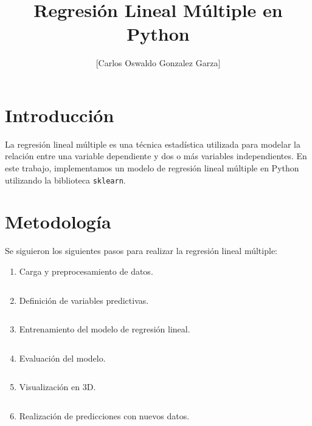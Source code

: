 \documentclass{article}
\title{Regresi\'on Lineal M\'ultiple en Python}
\author{[Carlos Oswaldo Gonzalez Garza]}
\begin{document}
\maketitle

\section{Introducci\'on}
La regresi\'on lineal m\'ultiple es una t\'ecnica estad\'istica utilizada para modelar la relaci\'on entre una variable dependiente y dos o m\'as variables independientes. En este trabajo, implementamos un modelo de regresi\'on lineal m\'ultiple en Python utilizando la biblioteca \texttt{sklearn}.

\section{Metodolog\'ia}
Se siguieron los siguientes pasos para realizar la regresi\'on lineal m\'ultiple:
\begin{enumerate}
    \item Carga y preprocesamiento de datos.
    \begin{verbatim}
    \end{verbatim}
    \item Definici\'on de variables predictivas.
    \begin{verbatim}
    \end{verbatim}
    \item Entrenamiento del modelo de regresi\'on lineal.
    \begin{verbatim}
    \end{verbatim}
    \item Evaluaci\'on del modelo.
    \begin{verbatim}
    \end{verbatim}
    \item Visualizaci\'on en 3D.
    \begin{verbatim}
    \end{verbatim}
    \item Realizaci\'on de predicciones con nuevos datos.
    \begin{verbatim}
    \end{verbatim}
\end{enumerate}
\end{document}

